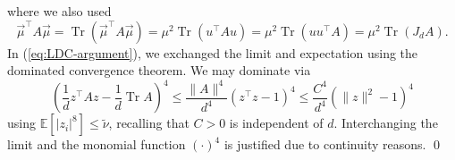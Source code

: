 \documentclass{article}
\begin{document}
where we also used
\begin{equation}
\vec{\mu}^\top A \vec{\mu}=\operatorname{Tr}(\vec{\mu}^\top A\vec{\mu})=\mu^2\operatorname{Tr}(u^\top A u)=\mu^2\operatorname{Tr}(uu^\top A)=\mu^2\operatorname{Tr}(J_d A).
\end{equation}
In (\ref{eq:LDC-argument}), we exchanged the limit and expectation using the dominated convergence theorem. We may dominate via
\begin{equation}
\left(\frac{1}{d}z^\top A z-\frac{1}{d}\operatorname{Tr}A\right)^4\leq\frac{\|A\|^4}{d^4}(z^\top z-1)^4\leq\frac{C^4}{d^4}\left(\|z\|^2-1\right)^4
\end{equation}
using $\mathbb{E}[|z_i|^8]\leq\tilde{\nu}$, recalling that $C>0$ is independent of $d$. Interchanging the limit and the monomial function $(\cdot)^4$ is justified due to continuity reasons.
\qed
\end{document}
